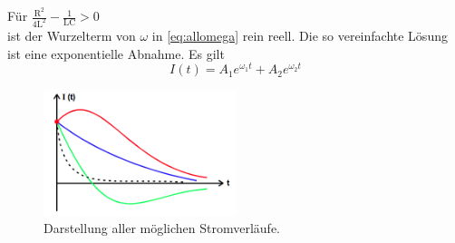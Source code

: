 Für $\frac{\mathup{R^2}}{4\mathup{L^2}}-\frac{1}{\mathup{LC}}>0$ \\
ist der Wurzelterm von $\omega$ in \eqref{eq:allomega} rein reell.
Die so vereinfachte Lösung ist eine exponentielle Abnahme.
Es gilt
\begin{equation}
	I(t)= A_1 e^{\omega_1 t} + A_2 e^{\omega_2 t}
\end{equation}
\begin{figure}
	\centering
	\includegraphics[width=0.5\textwidth]{Bilder/Loesungsform.png}
	\caption{Darstellung aller möglichen Stromverläufe. \cite{v354}}
\end{figure}


